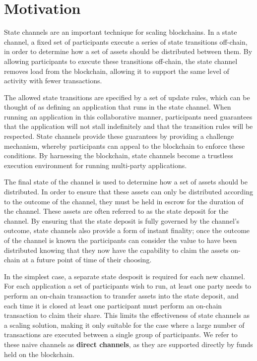 \section{Motivation}

State channels are an important technique for scaling blockchains.
In a state channel, a fixed set of participants execute a series of state transitions off-chain, in order to determine how a set of assets should be distributed between them.
By allowing participants to execute these transitions off-chain, the state channel removes load from the blockchain, allowing it to support the same level of activity with fewer transactions.

The allowed state transitions are specified by a set of update rules, which can be thought of as defining an application that runs in the state channel.
When running an application in this collaborative manner, participants need guarantees that the application will not stall indefinitely and that the transition rules will be respected.
State channels provide these guarantees by providing a challenge mechanism, whereby participants can appeal to the blockchain to enforce these conditions.
By harnessing the blockchain, state channels become a trustless execution environment for running multi-party applications.


The final state of the channel is used to determine how a set of assets should be distributed.
In order to ensure that these assets can only be distributed according to the outcome of the channel, they must be held in escrow for the duration of the channel.
These assets are often referred to as the state deposit for the channel.
By ensuring that the state deposit is fully governed by the channel's outcome, state channels also provide a form of instant finality; 
once the outcome of the channel is known the participants can consider the value to have been distributed knowing that they now have the capability to claim the assets on-chain at a future point of time of their choosing.

In the simplest case, a separate state desposit is required for each new channel.
For each application a set of participants wish to run, at least one party needs to perform an on-chain transaction to transfer assets into the state deposit, and each time it is closed at least one participant must perform an on-chain transaction to claim their share.
This limits the effectiveness of state channels as a scaling solution, making it only suitable for the case where a large number of transactions are executed between a single group of participants.
We refer to these naive channels as \textbf{direct channels}, as they are supported directly by funds held on the blockchain.

